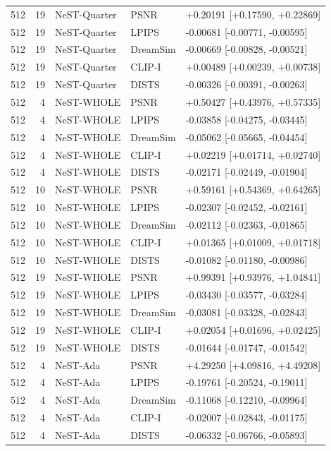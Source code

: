 \documentclass[10pt,letterpaper]{article}
\begin{document}
\begin{longtable}{@{}rrlll@{}}
512 & 19 & NeST-Quarter & PSNR & +0.20191 [+0.17590, +0.22869]\\
512 & 19 & NeST-Quarter & LPIPS & -0.00681 [-0.00771, -0.00595]\\
512 & 19 & NeST-Quarter & DreamSim & -0.00669 [-0.00828, -0.00521]\\
512 & 19 & NeST-Quarter & CLIP-I & +0.00489 [+0.00239, +0.00738]\\
512 & 19 & NeST-Quarter & DISTS & -0.00326 [-0.00391, -0.00263]\\
512 & 4 & NeST-WHOLE & PSNR & +0.50427 [+0.43976, +0.57335]\\
512 & 4 & NeST-WHOLE & LPIPS & -0.03858 [-0.04275, -0.03445]\\
512 & 4 & NeST-WHOLE & DreamSim & -0.05062 [-0.05665, -0.04454]\\
512 & 4 & NeST-WHOLE & CLIP-I & +0.02219 [+0.01714, +0.02740]\\
512 & 4 & NeST-WHOLE & DISTS & -0.02171 [-0.02449, -0.01904]\\
512 & 10 & NeST-WHOLE & PSNR & +0.59161 [+0.54369, +0.64265]\\
512 & 10 & NeST-WHOLE & LPIPS & -0.02307 [-0.02452, -0.02161]\\
512 & 10 & NeST-WHOLE & DreamSim & -0.02112 [-0.02363, -0.01865]\\
512 & 10 & NeST-WHOLE & CLIP-I & +0.01365 [+0.01009, +0.01718]\\
512 & 10 & NeST-WHOLE & DISTS & -0.01082 [-0.01180, -0.00986]\\
512 & 19 & NeST-WHOLE & PSNR & +0.99391 [+0.93976, +1.04841]\\
512 & 19 & NeST-WHOLE & LPIPS & -0.03430 [-0.03577, -0.03284]\\
512 & 19 & NeST-WHOLE & DreamSim & -0.03081 [-0.03328, -0.02843]\\
512 & 19 & NeST-WHOLE & CLIP-I & +0.02054 [+0.01696, +0.02425]\\
512 & 19 & NeST-WHOLE & DISTS & -0.01644 [-0.01747, -0.01542]\\
512 & 4 & NeST-Ada & PSNR & +4.29250 [+4.09816, +4.49208]\\
512 & 4 & NeST-Ada & LPIPS & -0.19761 [-0.20524, -0.19011]\\
512 & 4 & NeST-Ada & DreamSim & -0.11068 [-0.12210, -0.09964]\\
512 & 4 & NeST-Ada & CLIP-I & -0.02007 [-0.02843, -0.01175]\\
512 & 4 & NeST-Ada & DISTS & -0.06332 [-0.06766, -0.05893]\\

\end{longtable}
\end{document}
